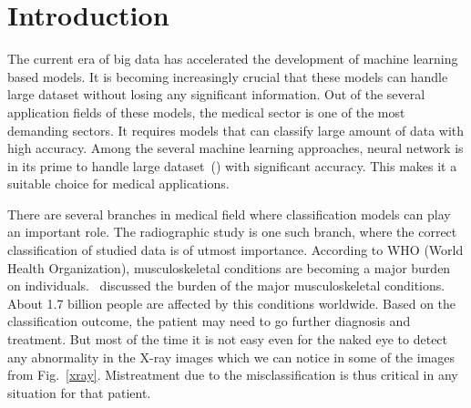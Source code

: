 \documentclass{article}
\begin{document}
\section{Introduction}
The current era of big data has accelerated the development of machine learning based models. It is becoming increasingly crucial that these models can handle large dataset without losing any significant information. Out of the several application fields of these models, the medical sector is one of the most demanding sectors. It requires models that can classify large amount of data with high accuracy. Among the several machine learning approaches, neural network is in its prime to handle large dataset~(\cite{deng}) with significant accuracy. This makes it a suitable choice for medical applications.

There are several branches in medical field where classification models can play an important role. The radiographic study is one such branch, where the correct classification of studied data is of utmost importance. According to WHO (World Health Organization), musculoskeletal conditions are becoming a major burden on individuals.~\cite{woolf_03} discussed the burden of the major musculoskeletal conditions. About 1.7 billion people are affected by this conditions worldwide. Based on the classification outcome, the patient may need to go further diagnosis and treatment. But most of the time it is not easy even for the naked eye to detect any abnormality in the X-ray images which we can notice in some of the images from Fig.~\ref{xray}. Mistreatment due to the misclassification is thus critical in any situation for that patient.
\end{document}
